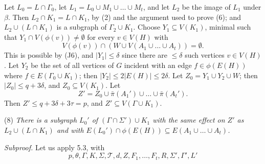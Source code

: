 Let $L_0 = L \cap \Gamma_0$, let $L_1 = L_0 \cup M_1 \cup \dots \cup M_t$, and let $L_2$ be the image of $L_1$ under $\beta$. Then $L_2 \cap K_1 = L \cap K_1$, by (2) and the argument used to prove (6); and $L_2 \cup (L \cap K_1)$ is a subgraph of $\Gamma_2 \cup K_1$. Choose $Y_1 \subseteq V(K_1)$, minimal such that $Y_1 \cap V(\phi(v)) \ne \emptyset$ for every $v \in V(H)$ with
\begin{equation*}
V(\phi(v)) \cap (W \cup V(A_1 \cup \dots \cup A_t)) = \emptyset.
\end{equation*}
This is possible by (J6), and $|Y_1| \le \delta$ since there are $\le \delta$ such vertices $v \in V(H)$. Let $Y_2$ be the set of all vertices of $G$ incident with an edge $f \in \phi(E(H))$ where $f \in E(\Gamma_0 \cup K_1)$; then $|Y_2| \le 2|E(H)| \le 2\delta$. Let $Z_0 = Y_1 \cup Y_2 \cup W$; then $|Z_0| \le q + 3\delta$, and $Z_0 \subseteq V(K_1)$. Let
\begin{equation*}
Z' = Z_0 \cup \bar{\pi}(A_1') \cup \dots \cup \bar{\pi}(A_t').
\end{equation*}
Then $Z' \le q + 3\delta + 3\tau = p$, and $Z' \subseteq V(\Gamma \cup K_1)$.

\hspace*{12pt}(8) \textit{There is a subgraph $L_0'$ of $(\Gamma \cap \Sigma') \cup K_1$ with the same effect on $Z'$ as $L_2 \cup (L \cap K_1)$ and with $E(L_0') \cap \phi(E(H)) \subseteq E(A_1 \cup \dots \cup A_t)$.}

\textit{Subproof.} Let us apply 5.3, with
\begin{equation*}
p, \theta, \Gamma, K, \Sigma, \mathcal{T}, d, Z, F_1, \dots, F_t, R, \Sigma', \Gamma', L'
\end{equation*}
